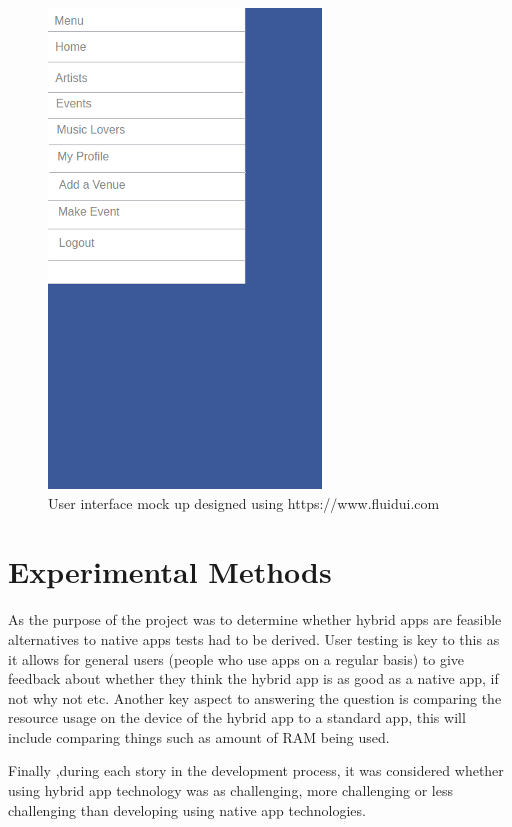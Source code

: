 \begin{figure}[H]
\includegraphics[scale=0.5]{images/ui3}
\caption{User interface mock up designed using https://www.fluidui.com}
\end{figure}

\section{Experimental Methods}
As the purpose of the project was to determine whether hybrid apps are feasible alternatives to native apps tests had to be derived. User testing is key to this as it allows for general users (people who use apps on a regular basis) to give feedback about whether they think the hybrid app is as good as a native app, if not why not etc. Another key aspect to answering the question is comparing the resource usage on the device of the hybrid app to a standard app, this will include comparing things such as amount of RAM being used.

Finally ,during each story in the development process, it was considered whether using hybrid app technology was as challenging, more challenging or less challenging than developing using native app technologies.
